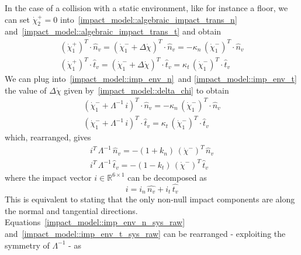 \documentclass[letterpaper, 10 pt, conference]{ieeeconf}  %
\begin{document}
In the case of a collision with a static environment, like for instance a floor, we can set $\dot{\chi}_{2}^{+} = 0$ into~\eqref{impact_model::algebraic_impact_trans_n} and~\eqref{impact_model::algebraic_impact_trans_t} and obtain
\begin{eqnarray}
\label{impact_model::imp_env_n}
\left(\dot{\chi}_{1}^{+}\right)^T\cdot\hat{n}_v = \left(\dot{\chi}_{1}^{-} + \Delta \dot{\chi}\right)^T\cdot\hat{n}_v = - \kappa_n\,\left(\dot{\chi}_{1}^{-}\right)^T\cdot\hat{n}_v\\
\label{impact_model::imp_env_t}
\left(\dot{\chi}_{1}^{+}\right)^T\cdot\hat{t}_v = \left(\dot{\chi}_{1}^{-} + \Delta \dot{\chi}\right)^T\cdot\hat{t}_v = \kappa_t\,\left(\dot{\chi}_{1}^{-}\right)^T\cdot\hat{t}_v
\end{eqnarray} 
We can plug into~\eqref{impact_model::imp_env_n}~and \eqref{impact_model::imp_env_t} the value of $\Delta \dot{\chi}$ given by~\eqref{impact_model::delta_chi} to obtain
\begin{eqnarray}
 \left(\dot{\chi}_{1}^{-} + \Lambda^{-1}\,i\right)^T\cdot\hat{n}_v = - \kappa_n\,\left(\dot{\chi}_{1}^{-}\right)^T\cdot\hat{n}_v
\\
 \left(\dot{\chi}_{1}^{-} + \Lambda^{-1}\,i\right)^T\cdot\hat{t}_v = \kappa_t\,\left(\dot{\chi}_{1}^{-}\right)^T\cdot\hat{t}_v
\end{eqnarray}
which, rearranged, gives
\begin{eqnarray}
\label{impact_model::imp_env_n_sys_raw}
 i^T\,\Lambda^{-1}\,\hat{n}_v = - \left(1 + k_n\right)\,\left(\dot{\chi}^{-}\right)^T\,\hat{n}_v\\
\label{impact_model::imp_env_t_sys_raw}
i^T\,\Lambda^{-1}\,\hat{t}_v = - \left(1 - k_t\right)\,\left(\dot{\chi}^{-}\right)^T\,\hat{t}_v
\end{eqnarray}
where the impact vector $i\in \mathbb{R}^{6\times 1}$ can be decomposed as~\cite{impact_dyn::yan_bin2019batting}
\begin{equation}\label{impact_model::i_decomp}
i = i_n\,\hat{n_v} + i_t\,\hat{t_v}
\end{equation}
This is equivalent to stating that the only non-null impact components are along the normal and tangential directions.\\
Equations~\eqref{impact_model::imp_env_n_sys_raw} and~\eqref{impact_model::imp_env_t_sys_raw} can be rearranged - exploiting the symmetry of $\Lambda^{-1}$ - as
\end{document}
